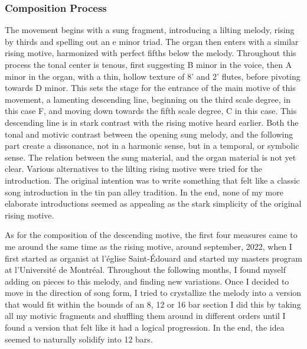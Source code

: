 \documentclass[12pt,twoside,maitrise]{dms}
\theoremstyle{definition}
\begin{document}
\subsubsection{Composition Process}

The movement begins with a sung fragment, introducing a lilting melody, rising by thirds and spelling out an e minor triad.
The organ then enters with a similar rising motive, harmonized with perfect fifths below the melody.
Throughout this process the tonal center is tenous, first suggesting B minor in the voice, then A minor in the organ, with a thin, hollow texture of 8' and 2' flutes, before pivoting towards D minor.
This sets the stage for the entrance of the main motive of this movement, a lamenting descending line, beginning on the third scale degree, in this case F, and moving down towards the fifth scale degree, C in this case.
This descending line is in stark contrast with the rising motive heard earlier.
Both the tonal and motivic contrast between the opening sung melody, and the following part create a dissonance, not in a harmonic sense, but in a temporal, or symbolic sense.
The relation between the sung material, and the organ material is not yet clear.
Various alternatives to the lilting rising motive were tried for the introduction.
The original intention was to write something that felt like a classic song introduction in the tin pan alley tradition.
In the end, none of my more elaborate introductions seemed as appealing as the stark simplicity of the original rising motive.



As for the composition of the descending motive, the first four measures came to me around the same time as the rising motive, around september, 2022, when I first started as organist at l'église Saint-Édouard and started my masters program at l'Université de Montréal.
Throughout the following months, I found myself adding on pieces to this melody, and finding new variations.
Once I decided to move in the direction of song form, I tried to crystallize the melody into a version that would fit within the bounds of an 8, 12 or 16 bar section I did this by taking all my motivic fragments and shuffling them around in different orders until I found a version that felt like it had a logical progression.
In the end, the idea seemed to naturally solidify into 12 bars.
\end{document}

